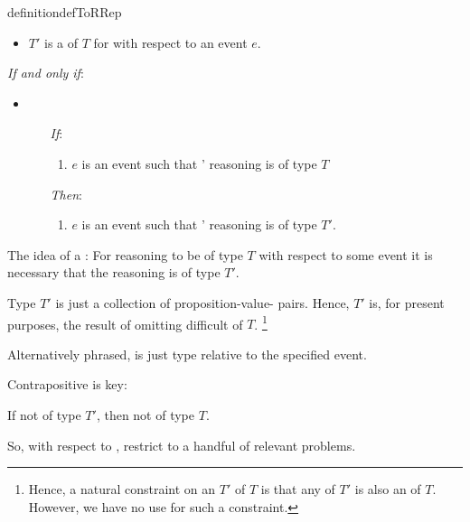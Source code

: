 \begin{note}
  \begin{restatable}[\rotor{2}]{definition}{defToRRep}
    \label{def:rotor}

    \begin{itemize}
    \item
      \(T'\) is a \emph{} of \(T\) for \vAgent{} with respect to an event \(e\).
    \end{itemize}

    \emph{If and only if}:

    \begin{itemize}
    \item

      \begin{itemize}
      \item[\emph{If}:]
        \begin{enumerate}[label=\alph*., ref=(\alph*), series=tRDef]
        \item
          \(e\) is an event such that \vAgent{}' reasoning is of type \(T\)
        \end{enumerate}
      \item[\emph{Then}:]
        \begin{enumerate}[label=\alph*., ref=(\alph*), resume*=tRDef]
        \item
          \(e\) is an event such that \vAgent{}' reasoning is of type \(T'\).
        \end{enumerate}
      \end{itemize}
    \end{itemize}
    \vspace{-\baselineskip}
  \end{restatable}

  The idea of a \tRep{}:
  For reasoning to be of type \(T\) with respect to some event it is necessary that the reasoning is of type \(T'\).

  Type \(T'\) is just a collection of proposition-value-\pool{} pairs.
  Hence, \(T'\) is, for present purposes, the result of omitting difficult  of \(T\).%
  \footnote{
    Hence, a natural constraint on an \tRep{} \(T'\) of \(T\) is that any \tI{} of \(T'\) is also an \tI{} of \(T\).
    However, we have no use for such a constraint.
  }

  Alternatively phrased, \rotor{} is just type relative to the specified event.

  Contrapositive is key:

  If not of type \(T'\), then not of type \(T\).

  So, with respect to , restrict to a handful of relevant problems.
\end{note}

